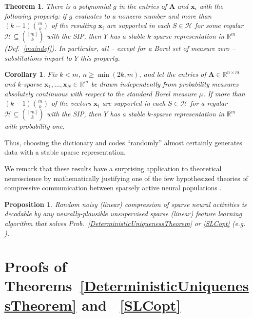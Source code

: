 \documentclass[9pt,twocolumn]{pnas-new}
\newtheorem{theorem}{Theorem}
\newtheorem{proposition}{Proposition}
\newtheorem{corollary}{Corollary}
\begin{document}
\begin{theorem}\label{robustPolythm}
There is a polynomial $g$ in the entries of $\mathbf{A}$ and $\mathbf{x}_i$ with the following property:  if $g$ evaluates to a nonzero number and more than \mbox{$(k-1){m \choose k}$} of the resulting $\mathbf{x}_i$ are supported in each $S \in \mathcal{H}$ for some regular $\mathcal{H} \subseteq {[m] \choose k}$ with the SIP, then $Y$ has a stable $k$-sparse representation in $\mathbb{R}^m$ (Def.~\ref{maindef}). In particular, all -- except for a Borel set of measure zero -- substitutions impart to $Y$ this property.
\end{theorem}

\begin{corollary}\label{ProbabilisticCor}
Fix $k < m$, $n \geq \min(2k, m)$, and let the entries of $\mathbf{A} \in \mathbb{R}^{n \times m}$ and $k$-sparse $\mathbf{x}_1, \ldots, \mathbf{x}_N \in \mathbb{R}^m$ be drawn independently from probability measures absolutely continuous with respect to the standard Borel measure $\mu$. If more than $(k-1){m \choose k}$ of the vectors $\mathbf{x}_i$ are supported in each $S \in \mathcal{H}$ for a regular $\mathcal{H} \subseteq {[m] \choose k}$ with the SIP, then $Y$ has a stable $k$-sparse representation in $\mathbb{R}^m$ with probability one.
\end{corollary}

Thus, choosing the dictionary and codes ``randomly'' almost certainly generates data with a stable sparse representation.

We remark that these results have a surprising application to theoretical neuroscience by mathematically justifying one of the few hypothesized theories of compressive communication between sparsely active neural populations \cite{Isely10}. 

\begin{proposition}
Random noisy (linear) compression of sparse neural activities is decodable by any neurally-plausible unsupervised sparse (linear) feature learning algorithm that solves Prob.~\ref{DeterministicUniquenessTheorem} or \ref{SLCopt} (e.g. \cite{rehnsommer2007, rozell2007neurally}).
\end{proposition}


\section{Proofs of Theorems~\ref{DeterministicUniquenessTheorem} and ~\ref{SLCopt}}\label{DUT}
\end{document}

